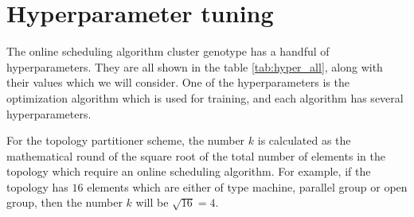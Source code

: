 \section{Hyperparameter tuning}

The online scheduling algorithm cluster genotype has a handful of hyperparameters. They are all shown in the table \ref{tab:hyper_all}, along with their values which we will consider. One of the hyperparameters is the optimization algorithm which is used for training, and each algorithm has several hyperparameters.

For the topology partitioner scheme, the number $k$ is calculated as the mathematical round of the square root of the total number of elements in the topology which require an online scheduling algorithm. For example, if the topology has $16$ elements which are either of type machine, parallel group or open group, then the number $k$ will be $\sqrt{16} = 4$.

